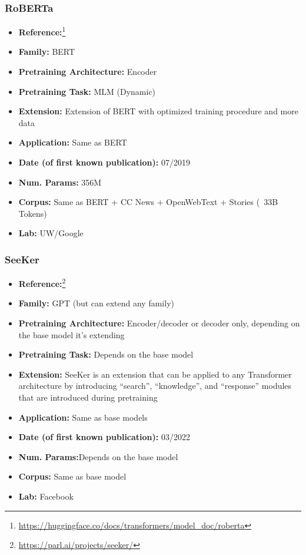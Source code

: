 \documentclass{article}
\begin{document}
\subsubsection{RoBERTa}

            \begin{itemize}
                \item \textbf{Reference:}\footnote{\url{https://huggingface.co/docs/transformers/model_doc/roberta}}\cite{liu2019roberta}
                \item \textbf{Family:} BERT 
                \item \textbf{Pretraining Architecture:} Encoder
                \item \textbf{Pretraining Task:} MLM (Dynamic)
                \item \textbf{Extension:} Extension of BERT with optimized training procedure and more data  
                \item \textbf{Application:} Same as BERT
                \item \textbf{Date (of first known publication):} 07/2019
                \item \textbf{Num. Params:} 356M
                \item \textbf{Corpus:} Same as BERT + CC News + OpenWebText + Stories (~33B Tokens)
                \item \textbf{Lab:} UW/Google
            \end{itemize}

\subsubsection{SeeKer}

            \begin{itemize}
                \item \textbf{Reference:}\footnote{\url{https://parl.ai/projects/seeker/}}\cite{shuster2022language}
                \item \textbf{Family:} GPT (but can extend any family) 
                \item \textbf{Pretraining Architecture:} Encoder/decoder or decoder only, depending on the base model it’s extending
                \item \textbf{Pretraining Task:} Depends on the base model
                \item \textbf{Extension:} SeeKer is an extension that can be applied to any Transformer architecture by introducing “search”, “knowledge”, and “response” modules that are introduced during pretraining  
                \item \textbf{Application:} Same as base models
                \item \textbf{Date (of first known publication):} 03/2022
                \item \textbf{Num. Params:}Depends on the base model
                \item \textbf{Corpus:} Same as base model
                \item \textbf{Lab:} Facebook
            \end{itemize}
\end{document}
